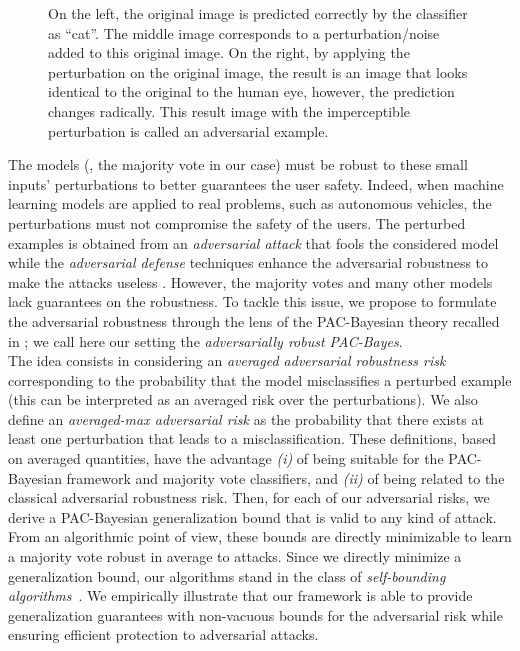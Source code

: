 \begin{figure}[H]
    \centering
    
    \caption[Illustration of the Adversarial Examples]{
    On the left, the original image is predicted correctly by the classifier as ``cat''. 
    The middle image corresponds to a perturbation/noise added to this original image.
    On the right, by applying the perturbation on the original image, the result is an image that looks identical to the original to the human eye, however, the prediction changes radically.
    This result image with the imperceptible perturbation is called an adversarial example.}
    \label{chap:mv-robustness:fig:examples}
\end{figure}

The models (\ie, the majority vote in our case) must be robust to these small inputs' perturbations to better guarantees the user safety.
Indeed, when machine learning models are applied to real problems, such as autonomous vehicles, the perturbations must not compromise the safety of the users.
The perturbed examples is obtained from an {\it adversarial attack} that fools the considered model while the {\it adversarial defense} techniques enhance the adversarial robustness to make the attacks useless \citep[see \eg,][]{PapernotMcDanielJhaFredriksonBerkayCelikSwami2016,GoodfellowShlensSzegedy2015,MadryMakelovSchmidtTsiprasVladu2018,CarliniWagner2017, ZantedeschiNicolaeRawat2017, KurakinGoodfellowBengio2017}.
However, the majority votes and many other models lack guarantees on the robustness.
To tackle this issue, we propose to formulate the adversarial robustness through the lens of the PAC-Bayesian theory recalled in ; we call here our setting the {\it adversarially robust PAC-Bayes}.\\

The idea consists in considering an {\it averaged adversarial robustness risk} corresponding to the probability that the model misclassifies a perturbed example (this can be interpreted as an averaged risk over the perturbations). 
We also define an {\it averaged-max adversarial risk} as the probability that there exists at least one perturbation that leads to a misclassification.
These definitions, based on averaged quantities, have the advantage {\it (i)} of being suitable for the PAC-Bayesian framework and majority vote classifiers, and {\it (ii)} of being related to the classical adversarial robustness risk.
Then, for each of our adversarial risks, we derive a PAC-Bayesian generalization bound that is valid to any kind of attack.
From an algorithmic point of view, these bounds are directly minimizable to learn a majority vote robust in average to attacks.
Since we directly minimize a generalization bound, our algorithms stand in the class of {\it self-bounding algorithms}~\citep{Freund1998}.
We empirically illustrate that our framework is able to provide generalization guarantees with non-vacuous bounds for the adversarial risk while ensuring efficient protection to adversarial attacks.\\ 

